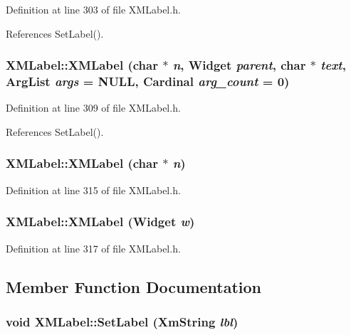 Definition at line 303 of file XMLabel.h.

References Set\-Label().
\subsubsection{\setlength{\rightskip}{0pt plus 5cm}XMLabel::XMLabel (char $\ast$ {\em n}, Widget {\em parent}, char $\ast$ {\em text}, Arg\-List {\em args} = NULL, Cardinal {\em arg\_\-count} = 0)\hspace{0.3cm}{\tt  [inline]}}\label{classXMLabel_a1}




Definition at line 309 of file XMLabel.h.

References Set\-Label().
\subsubsection{\setlength{\rightskip}{0pt plus 5cm}XMLabel::XMLabel (char $\ast$ {\em n})\hspace{0.3cm}{\tt  [inline]}}\label{classXMLabel_a2}




Definition at line 315 of file XMLabel.h.
\subsubsection{\setlength{\rightskip}{0pt plus 5cm}XMLabel::XMLabel (Widget {\em w})\hspace{0.3cm}{\tt  [inline]}}\label{classXMLabel_a3}




Definition at line 317 of file XMLabel.h.

\subsection{Member Function Documentation}
\subsubsection{\setlength{\rightskip}{0pt plus 5cm}void XMLabel::Set\-Label (Xm\-String {\em lbl})\hspace{0.3cm}{\tt  [inline]}}\label{classXMLabel_a5}




